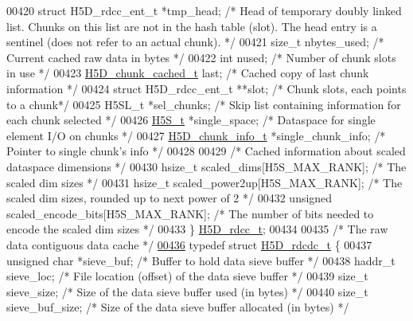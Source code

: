 \begin{DoxyCode}
00420     \textcolor{keyword}{struct }H5D\_rdcc\_ent\_t *tmp\_head; \textcolor{comment}{/* Head of temporary doubly linked list.  Chunks on this list are not
       in the hash table (slot).  The head entry is a sentinel (does not refer to an actual chunk). */}
00421     \textcolor{keywordtype}{size\_t}      nbytes\_used; \textcolor{comment}{/* Current cached raw data in bytes */}
00422     \textcolor{keywordtype}{int}         nused;  \textcolor{comment}{/* Number of chunk slots in use     */}
00423     \hyperlink{struct_h5_d__chunk__cached__t}{H5D\_chunk\_cached\_t} last;    \textcolor{comment}{/* Cached copy of last chunk information */}
00424     \textcolor{keyword}{struct }H5D\_rdcc\_ent\_t **slot; \textcolor{comment}{/* Chunk slots, each points to a chunk*/}
00425     H5SL\_t      *sel\_chunks; \textcolor{comment}{/* Skip list containing information for each chunk selected */}
00426     \hyperlink{struct_h5_s__t}{H5S\_t}      *single\_space; \textcolor{comment}{/* Dataspace for single element I/O on chunks */}
00427     \hyperlink{struct_h5_d__chunk__info__t}{H5D\_chunk\_info\_t}    *single\_chunk\_info;  \textcolor{comment}{/* Pointer to single chunk's info */}
00428 
00429     \textcolor{comment}{/* Cached information about scaled dataspace dimensions */}
00430     hsize\_t             scaled\_dims[H5S\_MAX\_RANK];          \textcolor{comment}{/* The scaled dim sizes */}
00431     hsize\_t             scaled\_power2up[H5S\_MAX\_RANK];      \textcolor{comment}{/* The scaled dim sizes, rounded up to next
       power of 2 */}
00432     \textcolor{keywordtype}{unsigned}            scaled\_encode\_bits[H5S\_MAX\_RANK];   \textcolor{comment}{/* The number of bits needed to encode the
       scaled dim sizes */}
00433 \} \hyperlink{struct_h5_d__rdcc__t}{H5D\_rdcc\_t};
00434 
00435 \textcolor{comment}{/* The raw data contiguous data cache */}
\hyperlink{struct_h5_d__rdcdc__t}{00436} \textcolor{keyword}{typedef} \textcolor{keyword}{struct }\hyperlink{struct_h5_d__rdcdc__t}{H5D\_rdcdc\_t} \{
00437     \textcolor{keywordtype}{unsigned} \textcolor{keywordtype}{char} *sieve\_buf;   \textcolor{comment}{/* Buffer to hold data sieve buffer */}
00438     haddr\_t sieve\_loc;          \textcolor{comment}{/* File location (offset) of the data sieve buffer */}
00439     \textcolor{keywordtype}{size\_t} sieve\_size;          \textcolor{comment}{/* Size of the data sieve buffer used (in bytes) */}
00440     \textcolor{keywordtype}{size\_t} sieve\_buf\_size;      \textcolor{comment}{/* Size of the data sieve buffer allocated (in bytes) */}

\end{DoxyCode}

